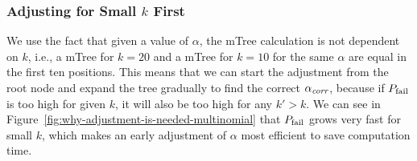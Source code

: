 \subsubsection{Adjusting for Small $k$ First}
We use the fact that given a value of $\alpha$, the mTree calculation is not dependent on $ k $, i.e., a mTree for $k=20$ and a mTree for $k=10$ for the same $\alpha$ are equal in the first ten positions.
%
This means that we can start the adjustment from the root node and expand the tree gradually to find the correct $ \alpha_\textit{corr} $, because if $P_{\operatorname{fail}}$ is too high for given $k$, it will also be too high for any $k' > k$. %
%
%
%
%
%
%
%
We can see in Figure~\ref{fig:why-adjustment-is-needed-multinomial} that $ P_{\operatorname{fail}} $ grows very fast for small $k$, which makes an early adjustment of $\alpha$ most efficient to save computation time.
%


